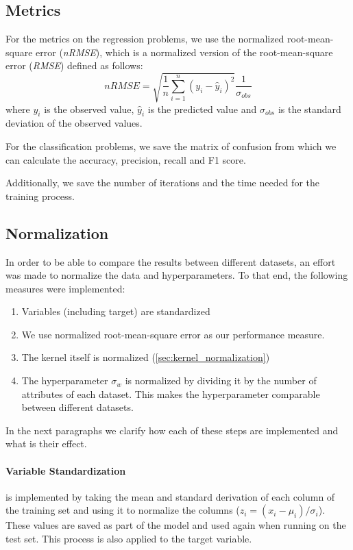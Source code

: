 
\subsection{Metrics}
\label{sec:metrics}

For the metrics on the regression problems,
we use the normalized root-mean-square error (\emph{nRMSE}),
which is a normalized version of the root-mean-square error (\emph{RMSE})
defined as follows:
\begin{equation}
    nRMSE = \sqrt{\frac{1}{n}\sum_{i=1}^n (y_i - \hat{y}_i)^2}\frac{1}{\sigma_{obs}}
\end{equation}
where $y_i$ is the observed value, $\hat{y}_i$ is the predicted value and
$\sigma_{obs}$ is the standard deviation of the observed values.

For the classification problems, we save the matrix of confusion from which we
can calculate the accuracy, precision, recall and F1 score.

Additionally, we save the number of iterations and the time needed for the
training process.

\subsection{Normalization}

In order to be able to compare the results between different datasets, an effort
was made to normalize the data and hyperparameters. To that end, the following
measures were implemented:

\begin{enumerate}
    \item Variables (including target) are standardized
    \item We use normalized root-mean-square error as our performance
          measure.
    \item The kernel itself is normalized (\cref{sec:kernel_normalization})
    \item The hyperparameter $\sigma_w$ is normalized by dividing it by the
          number of attributes of each dataset. This makes the hyperparameter
          comparable between different datasets.
\end{enumerate}

In the next paragraphs we clarify how each of these steps are implemented and
what is their effect.

\paragraph{Variable Standardization} is implemented by taking the mean and
standard derivation of each column of the training set and using it to normalize
the columns ($z_i = (x_i - \mu_i)/\sigma_i$). These values are saved as part of
the model and used again when running on the test set. This process is also
applied to the target variable.

